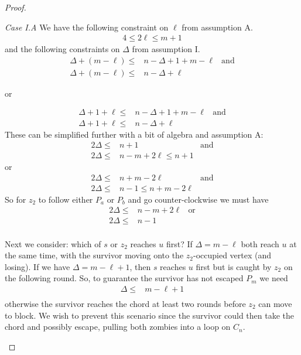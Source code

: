 \documentclass[letterpaper, 10pt]{article}
\begin{document}
\begin{proof}
\begin{proofpart}
  \textit{Case I.A} We have the following constraint on $\ell$ from
  assumption A.
  \begin{align*}
   4 \leq 2 \ell \leq m + 1
  \end{align*}
  and the following constraints on $\Delta$ from assumption I.
  \begin{align*}
   \Delta + (m - \ell) \leq & n - \Delta + 1 + m - \ell & \text{and} \\
   \Delta + (m - \ell) \leq & n - \Delta + \ell
  \end{align*}
  \begin{center}or\end{center}
  \begin{align*}
   \Delta + 1 + \ell \leq & n - \Delta + 1 + m - \ell & \text{and} \\
   \Delta + 1 + \ell \leq & n - \Delta + \ell
  \end{align*}
  These can be simplified further with a bit of algebra and  assumption A:
  \begin{align*}
   2 \Delta \leq & n+1                    & \text{and} \\
   2 \Delta \leq & n - m + 2\ell \leq n+1
  \end{align*}
  or
  \begin{align*}
   2 \Delta \leq & n+m -2 \ell             & \text{and} \\
   2 \Delta \leq & n -1 \leq n + m - 2\ell
  \end{align*}
  So for $z_2$ to follow either $P_a$ or $P_b$ and go counter-clockwise we must have
  \begin{align*}
   2 \Delta \leq & n - m + 2\ell & \text{or} \\
   2 \Delta \leq & n - 1                     \\
  \end{align*}

  Next we consider: which of $s$ or $z_2$ reaches $u$ first?
  If $\Delta = m - \ell$ both reach $u$ at the same time, with the survivor moving onto the $z_2$-occupied vertex (and losing).
  If we have $\Delta = m - \ell + 1$, then $s$ reaches $u$ first
  but is caught by $z_2$ on the following round.
  So, to guarantee the survivor has not escaped $P_m$ we need
  \begin{align*}
   \Delta \leq & m- \ell + 1 \\
  \end{align*}
  otherwise the survivor reaches the chord at least two rounds
  before $z_2$ can move to block. We wish to prevent this scenario since
  the survivor could then take the chord and possibly escape, pulling
  both zombies into a loop on $C_{n}$.


\end{proofpart}
\end{proof}
\end{document}
